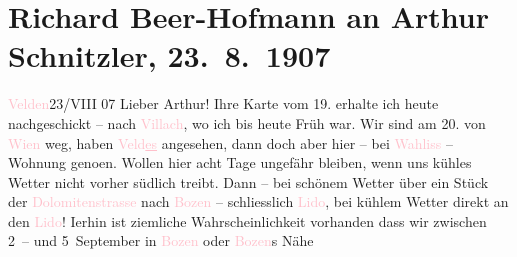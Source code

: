 

               \section[Richard Beer-Hofmann an Arthur Schnitzler, 23. 8. 1907]{ Richard Beer-Hofmann an Arthur Schnitzler, 23. 8. 1907}\nopagebreak{}\rehead{ }\normalsize\beginnumbering{} \toendnotes[C]{\smallbreak\pagebreak[2]} 
\toendnotes[C]{\smallbreak}\pstart
           \raggedleft{}{\pb}\textcolor{pink}{Velden}{}\ledrightnote{\textcolor{pink}{Velden}}{ }23/VIII 07\pend
           \pstart
           Lieber Arthur! Ihre Karte vom 19. erhalte ich heute
               nachgeschickt – nach \textcolor{pink}{Villach}{}\ledrightnote{\textcolor{pink}{Villach}}, wo ich bis heute
               Früh war. Wir sind am 20. von \textcolor{pink}{Wien}{}\ledrightnote{\textcolor{pink}{Wien}} weg,
               haben \textcolor{pink}{Veld\uline{es}}{}\ledrightnote{\textcolor{pink}{Veldes}} angesehen, dann doch aber hier – bei \textcolor{pink}{Wahliss}{}\ledrightnote{\textcolor{pink}{Etablissement Ernst Wahliss}}
               – Wohnung geno{\geminationm}en. Wollen hier acht Tage ungefähr
               bleiben, wenn uns kühles Wetter nicht vorher südlich treibt. Dann – bei schönem
               Wetter über ein Stück der \textcolor{pink}{Dolomitenstrasse}{}\ledrightnote{\textcolor{pink}{Große Dolomitenstraße}} nach
                  {\pb}\textcolor{pink}{Bozen}{}\ledrightnote{\textcolor{pink}{Bozen}} – schliesslich \textcolor{pink}{Lido}{}\ledrightnote{\textcolor{pink}{Lido}}, bei kühlem Wetter direkt an den \textcolor{pink}{Lido}{}\ledrightnote{\textcolor{pink}{Lido}}!
                  I{\geminationm}erhin ist ziemliche Wahrscheinlichkeit vorhanden
               dass wir zwischen 2 – und 5 September in \textcolor{pink}{Bozen}{}\ledrightnote{\textcolor{pink}{Bozen}} oder \textcolor{pink}{Bozen}{}\ledrightnote{\textcolor{pink}{Bozen}}s Nähe
